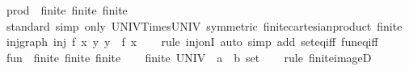 \begin{isabellebody}
\isamarkupfalse%
\isanewline
\isanewline
{}\isamarkupfalse%
\ prod\ {\isacharcolon}{\kern0pt}{\isacharcolon}{\kern0pt}\ {\isacharparenleft}{\kern0pt}finite{\isacharcomma}{\kern0pt}\ finite{\isacharparenright}{\kern0pt}\ finite\isanewline
%
\isadelimproof
\ \ %
\endisadelimproof
%
\isatagproof
{}\isamarkupfalse%
\ standard\ {\isacharparenleft}{\kern0pt}simp\ only{\isacharcolon}{\kern0pt}\ UNIV{\isacharunderscore}{\kern0pt}Times{\isacharunderscore}{\kern0pt}UNIV\ {\isacharbrackleft}{\kern0pt}symmetric{\isacharbrackright}{\kern0pt}\ finite{\isacharunderscore}{\kern0pt}cartesian{\isacharunderscore}{\kern0pt}product\ finite{\isacharparenright}{\kern0pt}%
\endisatagproof
{\isafoldproof}%
%
\isadelimproof
\isanewline
%
\endisadelimproof
\isanewline
{}\isamarkupfalse%
\ inj{\isacharunderscore}{\kern0pt}graph{\isacharcolon}{\kern0pt}\ {\isachardoublequoteopen}inj\ {\isacharparenleft}{\kern0pt}{\isasymlambda}f{\isachardot}{\kern0pt}\ {\isacharbraceleft}{\kern0pt}{\isacharparenleft}{\kern0pt}x{\isacharcomma}{\kern0pt}\ y{\isacharparenright}{\kern0pt}{\isachardot}{\kern0pt}\ y\ {\isacharequal}{\kern0pt}\ f\ x{\isacharbraceright}{\kern0pt}{\isacharparenright}{\kern0pt}{\isachardoublequoteclose}\isanewline
%
\isadelimproof
\ \ %
\endisadelimproof
%
\isatagproof
{}\isamarkupfalse%
\ {\isacharparenleft}{\kern0pt}rule\ inj{\isacharunderscore}{\kern0pt}onI{\isacharparenright}{\kern0pt}\ {\isacharparenleft}{\kern0pt}auto\ simp\ add{\isacharcolon}{\kern0pt}\ set{\isacharunderscore}{\kern0pt}eq{\isacharunderscore}{\kern0pt}iff\ fun{\isacharunderscore}{\kern0pt}eq{\isacharunderscore}{\kern0pt}iff{\isacharparenright}{\kern0pt}%
\endisatagproof
{\isafoldproof}%
%
\isadelimproof
\isanewline
%
\endisadelimproof
\isanewline
{}\isamarkupfalse%
\ {\isachardoublequoteopen}fun{\isachardoublequoteclose}\ {\isacharcolon}{\kern0pt}{\isacharcolon}{\kern0pt}\ {\isacharparenleft}{\kern0pt}finite{\isacharcomma}{\kern0pt}\ finite{\isacharparenright}{\kern0pt}\ finite\isanewline
%
\isadelimproof
%
\endisadelimproof
%
\isatagproof
{}\isamarkupfalse%
\isanewline
\ \ \isamarkupfalse%
\ {\isachardoublequoteopen}finite\ {\isacharparenleft}{\kern0pt}UNIV\ {\isacharcolon}{\kern0pt}{\isacharcolon}{\kern0pt}\ {\isacharparenleft}{\kern0pt}{\isacharprime}{\kern0pt}a\ {\isasymRightarrow}\ {\isacharprime}{\kern0pt}b{\isacharparenright}{\kern0pt}\ set{\isacharparenright}{\kern0pt}{\isachardoublequoteclose}\isanewline
\ \ \isamarkupfalse%
\ {\isacharparenleft}{\kern0pt}rule\ finite{\isacharunderscore}{\kern0pt}imageD{\isacharparenright}{\kern0pt}\isanewline

\end{isabellebody}
